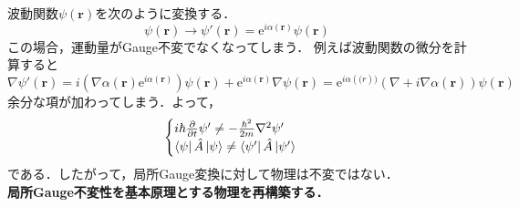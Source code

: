\documentclass{standalone}
\begin{document}
  波動関数$\psi(\bm{r})$を次のように変換する．
  \begin{equation}
    \psi(\bm{r})\to\psi'(\bm{r})=\mathrm{e}^{i\alpha(\bm{r})}\psi(\bm{r})
  \end{equation}
  この場合，運動量がGauge不変でなくなってしまう．
  例えば波動関数の微分を計算すると
  \begin{equation}
    \nabla\psi'(\bm{r})=i(\nabla\alpha(\bm{r})\mathrm{e}^{i\alpha(\bm{r})})\psi(\bm{r})+\mathrm{e}^{i\alpha(\bm{r})}\nabla\psi(\bm{r})=\mathrm{e}^{i\alpha(\bm(r))}(\nabla+i\nabla\alpha(\bm{r}))\psi(\bm{r}) 
  \end{equation}
  余分な項が加わってしまう．よって，
  \begin{equation}
    \begin{cases}
      i\hbar\frac{\partial}{\partial t}\psi'\ne -\frac{\hbar^2}{2m}\nabla^2\psi'\\
      \bra{\psi}\hat{A}\ket{\psi}\ne\bra{\psi'}\hat{A}\ket{\psi'}
    \end{cases}
  \end{equation}
  である．したがって，局所Gauge変換に対して物理は不変ではない．\\
  \textbf{局所Gauge不変性を基本原理とする物理を再構築する．}
\end{document}
